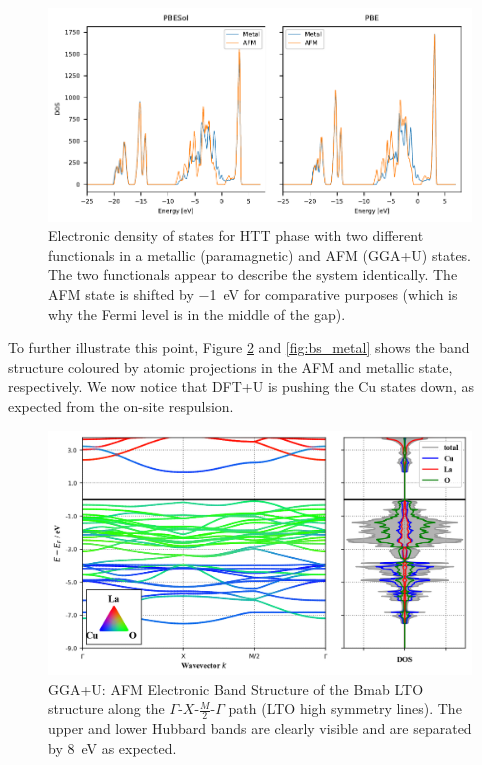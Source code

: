 \begin{figure}
    \centering
    \includegraphics{fig/simulation/htt_dos.pdf}
    \caption[Electronic DOS: Metal and AFM]{Electronic density of states for HTT phase with two different functionals in a metallic (paramagnetic) and AFM (GGA+U) states. The two functionals appear to describe the system identically. The AFM state is shifted by \SI{-1}{\eV} for comparative purposes (which is why the Fermi level is in the middle of the gap).}
    \label{fig:edos_htt}
\end{figure}

To further illustrate this point, Figure \ref{fig:bs_afm2} and \ref{fig:bs_metal} shows the band structure coloured by atomic projections in the AFM and metallic state, respectively. We now notice that DFT+U is pushing the Cu states down, as expected from the on-site respulsion.

\begin{figure}
    \centering
    \includegraphics[width=\textwidth]{fig/simulation/bs_afm2.png}
    \caption[GGA+U: AFM Electronic Band Structure]{GGA+U: AFM Electronic Band Structure of the Bmab LTO structure along the $\Gamma$-$X$-$\frac{M}{2}$-$\Gamma$ path (LTO high symmetry lines). The upper and lower Hubbard bands are clearly visible and are separated by \SI{8}{\eV} as expected.}
    \label{fig:bs_afm2}
\end{figure}

